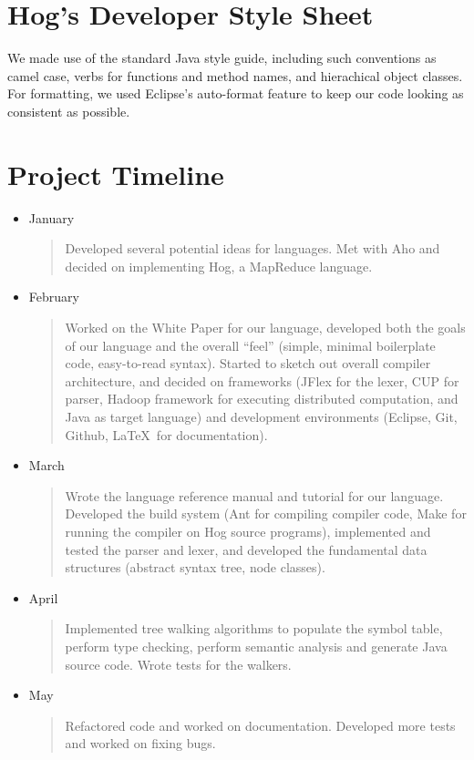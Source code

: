 \documentclass{report}
\begin{document}
\section{Hog's Developer Style Sheet}

We made use of the standard Java style guide, including such conventions as camel
case, verbs for functions and method names, and hierachical object classes. For
formatting, we used Eclipse's auto-format feature to keep our code looking as
consistent as possible. 

\section{Project Timeline}

\begin{itemize}
\item[] January
\begin{quotation}
\noindent Developed several potential ideas for languages. Met with Aho and decided on
implementing Hog, a MapReduce language.   
\end{quotation}
\item[] February
\begin{quotation}
\noindent Worked on the White Paper for our language, developed both the goals of our language
and the overall ``feel'' (simple, minimal boilerplate code, easy-to-read syntax).
Started to sketch out overall compiler architecture, and decided on frameworks
(JFlex for the lexer, CUP for parser, Hadoop framework for executing distributed computation, and Java as target language) and development environments (Eclipse, Git, Github, \LaTeX $\,$ for documentation). 
\end{quotation}
\item[] March
\begin{quotation}
\noindent Wrote the language reference manual and tutorial for our language. 
Developed the build system (Ant for compiling compiler code, Make for running
the compiler on Hog source programs), implemented and tested the parser and lexer,
and developed the fundamental data structures (abstract syntax tree, node classes).
\end{quotation}
\item[] April
\begin{quotation}
\noindent Implemented tree walking algorithms to populate the symbol table, perform
type checking, perform semantic analysis and generate Java source code. Wrote
tests for the walkers. 
\end{quotation}
\item[] May
\begin{quotation}
\noindent Refactored code and worked on documentation. Developed more tests and
worked on fixing bugs. 
\end{quotation}
\end{itemize}
\end{document}
